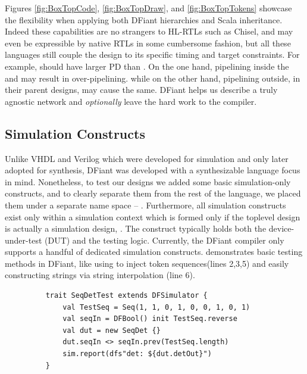 Figures \ref{fig:BoxTopCode}, \ref{fig:BoxTopDraw}, and \ref{fig:BoxTopTokens} showcase the flexibility when applying both DFiant hierarchies and Scala inheritance. Indeed these capabilities are no strangers to HL-RTLs such as Chisel, and may even be expressible by native RTLs in some cumbersome fashion, but all these languages still couple the design to its specific timing and target constraints. For example,   should have larger PD than . On the one hand, pipelining inside the  and  may result in over-pipelining. while on the other hand, pipelining outside, in their parent designs, may cause the same. DFiant helps us describe a truly agnostic network and \emph{optionally} leave the hard work to the compiler. 




\subsection{Simulation Constructs}
\label{sec:simulation}
Unlike VHDL and Verilog which were developed for simulation and only later adopted for synthesis, DFiant was developed with a synthesizable language focus in mind. Nonetheless, to test our designs we added some basic simulation-only constructs, and to clearly separate them from the rest of the language, we placed them under a separate name space -- . Furthermore, all simulation constructs exist only within a simulation context which is formed only if the toplevel design is actually a simulation design, . The  construct typically holds both the device-under-test (DUT) and the testing logic. Currently, the DFiant compiler only supports a handful of dedicated simulation constructs.
 demonstrates basic testing methods in DFiant, like using  to inject token sequences(lines 2,3,5) and easily constructing strings via string interpolation (line 6).

\begin{figure}[h]
  \centering
  \captionsetup{justification=centering}    
  
  \begin{verbatim}
	trait SeqDetTest extends DFSimulator {
		val TestSeq = Seq(1, 1, 0, 1, 0, 0, 1, 0, 1)
		val seqIn = DFBool() init TestSeq.reverse
		val dut = new SeqDet {}
		dut.seqIn <> seqIn.prev(TestSeq.length)
		sim.report(dfs"det: ${dut.detOut}")
	}
  \end{verbatim}
  \label{fig:FibTest}
\end{figure}






